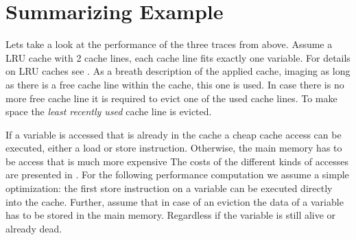 \documentclass[onecolumn, openright, master, english, signatures]{dbrgrptt}
\begin{document}
\section{Summarizing Example}

Lets take a look at the performance of the three \ac{trace}s from above.
Assume a \ac{LRU} cache with 2 cache lines, each cache line fits exactly one variable.
For details on \ac{LRU} caches see .
As a breath description of the applied cache, imaging as long as there is a free cache line within the cache, this one is used.
In case there is no more free cache line it is required to evict one of the used cache lines.
To make space the \emph{least recently used} cache line is evicted.

If a variable is accessed that is already in the cache a cheap cache access can be executed, either a load or store instruction.
Otherwise, the main memory has to be access that is much more expensive
The costs of the different kinds of accesses are presented in .
For the following performance computation we assume a simple optimization: the first store instruction on a variable can be executed directly into the cache.
Further, assume that in case of an eviction the data of a variable has to be stored in the main memory.
Regardless if the variable is still alive or already dead.
\end{document}
